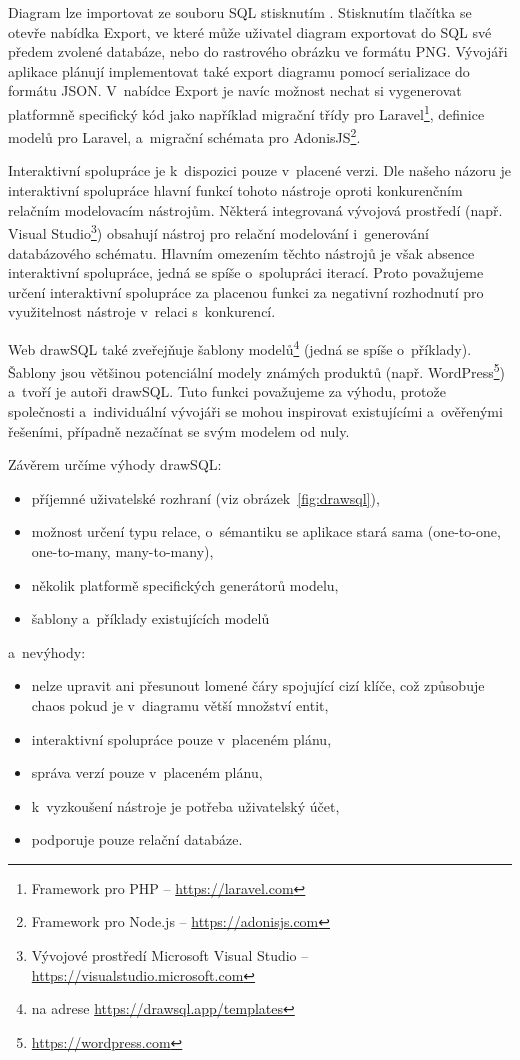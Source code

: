 Diagram lze importovat ze souboru SQL stisknutím .
Stisknutím tlačítka  se otevře nabídka Export, ve které může uživatel diagram exportovat do SQL své předem zvolené databáze, nebo do rastrového obrázku ve formátu PNG.
Vývojáři aplikace plánují implementovat také export diagramu pomocí serializace do formátu JSON.
V~nabídce Export je navíc možnost nechat si vygenerovat platformně specifický kód jako například migrační třídy pro
Laravel\footnote{Framework pro PHP -- \url{https://laravel.com}},
definice modelů pro Laravel, a~migrační schémata pro
AdonisJS\footnote{Framework pro Node.js -- \url{https://adonisjs.com}}.

Interaktivní spolupráce je k~dispozici pouze v~placené verzi.
Dle našeho názoru je interaktivní spolupráce hlavní funkcí tohoto nástroje oproti konkurenčním relačním modelovacím nástrojům.
Některá integrovaná vývojová prostředí (např. Visual Studio\footnote{Vývojové prostředí Microsoft Visual Studio -- \url{https://visualstudio.microsoft.com}}) obsahují nástroj pro relační modelování i~generování databázového schématu.
Hlavním omezením těchto nástrojů je však absence interaktivní spolupráce, jedná se spíše o~spolupráci iterací.
Proto považujeme určení interaktivní spolupráce za placenou funkci za negativní rozhodnutí pro využitelnost nástroje v~relaci s~konkurencí.

Web drawSQL také zveřejňuje šablony modelů\footnote{na adrese \url{https://drawsql.app/templates}} (jedná se spíše o~příklady).
Šablony jsou většinou potenciální modely známých produktů (např. WordPress\footnote{\url{https://wordpress.com}}) a~tvoří je autoři drawSQL.
Tuto funkci považujeme za výhodu, protože společnosti a~individuální vývojáři se mohou inspirovat existujícími a~ověřenými řešeními, případně nezačínat se svým modelem od nuly.

Závěrem určíme výhody drawSQL:
\begin{itemize}
  \item příjemné uživatelské rozhraní (viz obrázek~\ref{fig:drawsql}),
  \item možnost určení typu relace, o~sémantiku se aplikace stará sama (one-to-one, one-to-many, many-to-many),
  \item několik platformě specifických generátorů modelu,
  \item šablony a~příklady existujících modelů
\end{itemize}
a~nevýhody:
\begin{itemize}
  \item nelze upravit ani přesunout lomené čáry spojující cizí klíče, což způsobuje chaos pokud je v~diagramu větší množství entit,
  \item interaktivní spolupráce pouze v~placeném plánu,
  \item správa verzí pouze v~placeném plánu,
  \item k~vyzkoušení nástroje je potřeba uživatelský účet,
  \item podporuje pouze relační databáze.
\end{itemize}

